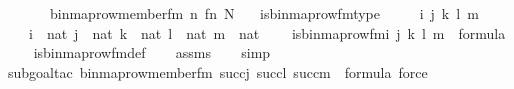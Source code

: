 \begin{isabellebody}
\ \ \ \ \ \ binmap{\isacharunderscore}{\kern0pt}row{\isacharprime}{\kern0pt}{\isacharunderscore}{\kern0pt}member{\isacharunderscore}{\kern0pt}fm{\isacharparenleft}{\kern0pt}{}{\isacharcomma}{\kern0pt}\ n{\isacharhash}{\kern0pt}{\isacharplus}{\kern0pt}{}{\isacharcomma}{\kern0pt}\ fn{\isacharhash}{\kern0pt}{\isacharplus}{\kern0pt}{}{\isacharcomma}{\kern0pt}\ N{\isacharhash}{\kern0pt}{\isacharplus}{\kern0pt}{}{\isacharparenright}{\kern0pt}{\isacharparenright}{\kern0pt}{\isacharparenright}{\kern0pt}{\isacharparenright}{\kern0pt}{\isachardoublequoteclose}\ \ \isanewline
\isanewline
{}\isamarkupfalse%
\ is{\isacharunderscore}{\kern0pt}binmap{\isacharunderscore}{\kern0pt}row{\isacharprime}{\kern0pt}{\isacharunderscore}{\kern0pt}fm{\isacharunderscore}{\kern0pt}type\ {\isacharcolon}{\kern0pt}\ \isanewline
\ \ \ i\ j\ k\ l\ m\ \isanewline
\ \ \ {\isachardoublequoteopen}i\ {\isasymin}\ nat{\isachardoublequoteclose}\ {\isachardoublequoteopen}j\ {\isasymin}\ nat{\isachardoublequoteclose}\ {\isachardoublequoteopen}k\ {\isasymin}\ nat{\isachardoublequoteclose}\ {\isachardoublequoteopen}l\ {\isasymin}\ nat{\isachardoublequoteclose}\ {\isachardoublequoteopen}m\ {\isasymin}\ nat{\isachardoublequoteclose}\ \isanewline
\ \ \ {\isachardoublequoteopen}is{\isacharunderscore}{\kern0pt}binmap{\isacharunderscore}{\kern0pt}row{\isacharprime}{\kern0pt}{\isacharunderscore}{\kern0pt}fm{\isacharparenleft}{\kern0pt}i{\isacharcomma}{\kern0pt}\ j{\isacharcomma}{\kern0pt}\ k{\isacharcomma}{\kern0pt}\ l{\isacharcomma}{\kern0pt}\ m{\isacharparenright}{\kern0pt}\ {\isasymin}\ formula{\isachardoublequoteclose}\isanewline
%
\isadelimproof
\ \ %
\endisadelimproof
%
\isatagproof
{}\isamarkupfalse%
\ is{\isacharunderscore}{\kern0pt}binmap{\isacharunderscore}{\kern0pt}row{\isacharprime}{\kern0pt}{\isacharunderscore}{\kern0pt}fm{\isacharunderscore}{\kern0pt}def\isanewline
\ \ \isamarkupfalse%
\ assms\isanewline
\ \ \isamarkupfalse%
\ simp\isanewline
\ \ \isamarkupfalse%
{\isacharparenleft}{\kern0pt}subgoal{\isacharunderscore}{\kern0pt}tac\ {\isachardoublequoteopen}binmap{\isacharunderscore}{\kern0pt}row{\isacharprime}{\kern0pt}{\isacharunderscore}{\kern0pt}member{\isacharunderscore}{\kern0pt}fm{\isacharparenleft}{\kern0pt}{}{\isacharcomma}{\kern0pt}\ succ{\isacharparenleft}{\kern0pt}j{\isacharparenright}{\kern0pt}{\isacharcomma}{\kern0pt}\ succ{\isacharparenleft}{\kern0pt}l{\isacharparenright}{\kern0pt}{\isacharcomma}{\kern0pt}\ succ{\isacharparenleft}{\kern0pt}m{\isacharparenright}{\kern0pt}{\isacharparenright}{\kern0pt}\ {\isasymin}\ formula{\isachardoublequoteclose}{\isacharcomma}{\kern0pt}\ force{\isacharparenright}{\kern0pt}\isanewline

\end{isabellebody}
